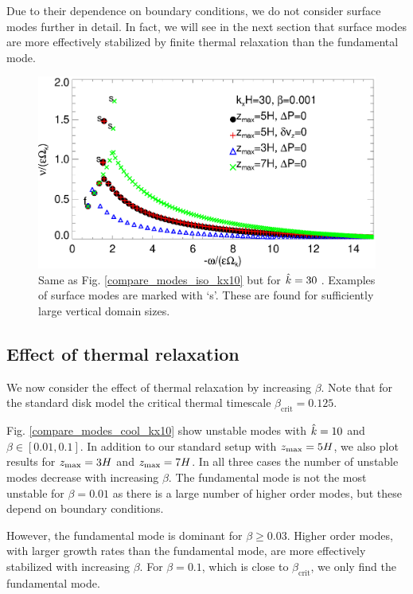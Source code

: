 Due to their dependence on boundary conditions, we
do not consider surface modes further in detail. In fact, we will see
in the next section that surface modes are more effectively stabilized
by finite thermal relaxation than the fundamental mode. %

\begin{figure}
  \includegraphics[width=\linewidth]{figures/compare_modes_iso_kx30_tags.ps}
  \caption{Same as Fig. \ref{compare_modes_iso_kx10} but for $\hat{k}=30$
    \label{compare_modes_iso_kx30}. Examples of surface modes are
    marked with `s'. These are found for sufficiently large vertical
    domain sizes. 
  }
\end{figure}


\subsection{Effect of thermal relaxation}\label{therm_relax_eff}
We now consider the effect of thermal relaxation by increasing
$\beta$. Note that for the standard disk model the critical thermal 
timescale $\beta_\mathrm{crit} = 0.125$.  

Fig. \ref{compare_modes_cool_kx10} show unstable modes with $\hat{k}=10$
and $\beta\in[0.01,0.1]$. In addition to our standard setup with 
$z_\mathrm{max}=5H$, we also plot results for $z_\mathrm{max}=3H$ and $z_\mathrm{max}=7H$. In all
three cases the number of unstable modes decrease with increasing
$\beta$. The fundamental mode is not the most unstable for 
$\beta=0.01$ as there is a large number of higher order modes, but
these depend on boundary conditions.  

However, the fundamental mode is dominant for $\beta \geq 
0.03$. Higher order modes, with larger growth rates than the
fundamental mode, are more effectively stabilized with increasing 
$\beta$. For $\beta=0.1$, which is close to $\beta_\mathrm{crit}$, we
only find the fundamental mode. 

